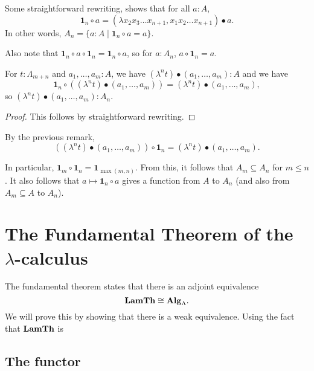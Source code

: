 \begin{remark}
  Some straightforward rewriting, shows that for all $ a : A $,
  \[ \mathbf 1_n \circ a = (\lambda x_2 x_3 \dots x_{n + 1}, x_1 x_2 \dots x_{n + 1}) \bullet a. \]
  In other words, $ A_n = \{ a : A \mid \mathbf 1_n \circ a = a \} $.
\end{remark}

\begin{remark}
  Also note that $ \mathbf 1_n \circ a \circ \mathbf 1_n = \mathbf 1_n \circ a $, so for $ a : A_n $, $ a \circ \mathbf 1_n = a $.
\end{remark}

\begin{lemma}
  For $ t: \Lambda_{m + n} $ and $ a_1, \dots, a_m: A $, we have $ (\lambda^n t) \bullet (a_1, \dots, a_m) : A $ and we have
  \[ \mathbf 1_n \circ ((\lambda^n t) \bullet (a_1, \dots, a_m)) = (\lambda^n t) \bullet (a_1, \dots, a_m), \]
  so $ (\lambda^n t) \bullet (a_1, \dots, a_m) : A_n $.
\end{lemma}
\begin{proof}
  This follows by straightforward rewriting.
\end{proof}

\begin{corollary}
  By the previous remark,
  \[ ((\lambda^n t) \bullet (a_1, \dots, a_m)) \circ \mathbf 1_n = (\lambda^n t) \bullet (a_1, \dots, a_m). \]
\end{corollary}
\begin{corollary}
  In particular, $ \mathbf 1_m \circ \mathbf 1_n = \mathbf 1_{\max(m, n)} $. From this, it follows that $ A_m \subseteq A_n $ for $ m \leq n $. It also follows that $ a \mapsto \mathbf 1_n \circ a $ gives a function from $ A $ to $ A_n $ (and also from $ A_m \subseteq A $ to $ A_n $).
\end{corollary}


\section{The Fundamental Theorem of the \texorpdfstring{$ \lambda $-}{lambda }calculus}

The fundamental theorem states that there is an adjoint equivalence
\[ \mathbf{LamTh} \cong \mathbf{Alg}_{\Lambda}. \]
We will prove this by showing that there is a weak equivalence. Using the fact that $ \mathbf{LamTh} $ is


\subsection{The functor}

